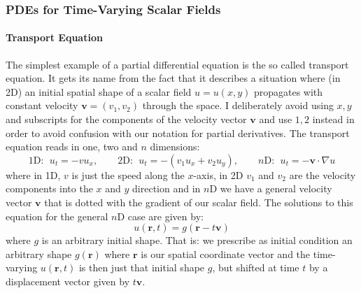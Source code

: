 


\subsubsection{PDEs for Time-Varying Scalar Fields}

\paragraph{Transport Equation} 
The simplest example of a partial differential equation is the so called transport equation. It gets its name from the fact that it describes a situation where (in 2D) an initial spatial shape of a scalar field $u = u(x,y)$ propagates with constant velocity $\mathbf{v} = (v_1, v_2)$ through the space. I deliberately avoid using $x,y$ and subscripts for the components of the velocity vector $\mathbf{v}$ and use $1,2$ instead in order to avoid confusion with our notation for partial derivatives. The transport equation reads in one, two and $n$ dimensions:
\begin{equation}
1\text{D: } \; u_t = - v u_x , \qquad 
2\text{D: } \; u_t = - (v_1 u_x + v_2 u_y), \qquad 
n\text{D: } \; u_t = - \mathbf{v} \cdot \nabla u
\end{equation}
where in 1D, $v$ is just the speed along the $x$-axis, in 2D $v_1$ and $v_2$ are the velocity components into the $x$ and $y$ direction and in $n$D we have a general velocity vector $\mathbf{v}$ that is dotted with the gradient of our scalar field. The solutions to this equation for the general $n$D case are given by:
\begin{equation}
u(\mathbf{r}, t) = g(\mathbf{r} - t \mathbf{v})
\end{equation}
where $g$ is an arbitrary initial shape. That is: we prescribe as initial condition an arbitrary shape $g(\mathbf{r})$ where $\mathbf{r}$ is our spatial coordinate vector and the time-varying $u(\mathbf{r}, t)$ is then just that initial shape $g$, but shifted at time $t$ by a displacement vector given by $t \mathbf{v}$.


